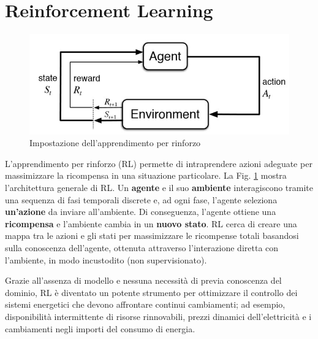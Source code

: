 \documentclass[italian, Lau, oneside]{sapthesis}
\begin{document}
\section{Reinforcement Learning}
\label{sec:MARL}
\begin{figure}[h]
    \centering
    \includegraphics[width=\textwidth]{RL.jpg}
    \caption{Impostazione dell'apprendimento per rinforzo}
    \label{fig:RL}
\end{figure}

L'apprendimento per rinforzo (RL) permette di intraprendere azioni adeguate per massimizzare la ricompensa in una situazione particolare. La Fig. \ref{fig:RL} mostra l'architettura generale di RL. Un \textbf{agente} e il suo \textbf{ambiente} interagiscono tramite una sequenza di fasi temporali discrete e, ad ogni fase, l'agente seleziona \textbf{un'azione} da inviare all'ambiente. Di conseguenza, l'agente ottiene una \textbf{ricompensa} e l'ambiente cambia in un \textbf{nuovo stato}. RL cerca di creare una mappa tra le azioni e gli stati per massimizzare le ricompense totali basandosi sulla conoscenza dell'agente, ottenuta attraverso l'interazione diretta con l'ambiente, in modo incustodito (non supervisionato). 

Grazie all'assenza di modello e nessuna necessità di previa conoscenza del dominio, RL è diventato un potente strumento per ottimizzare il controllo dei sistemi energetici che devono affrontare continui cambiamenti; ad esempio, disponibilità intermittente di risorse rinnovabili, prezzi dinamici dell'elettricità e i cambiamenti negli importi del consumo di energia.
\end{document}
